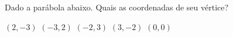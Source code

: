 Dado a parábola abaixo. Quais as coordenadas de seu vértice?

\parbox{0.4\linewidth}{

$(2,-3)$
$(-3,2)$
$(-2,3)$
$(3,-2)$
$(0,0)$

}\parbox{0.59\linewidth}{
}


